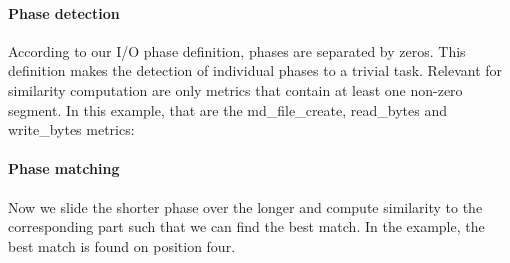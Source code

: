 \documentclass{jhps}
\begin{document}
\paragraph{Phase detection}
According to our I/O phase definition, phases are separated by zeros.
This definition makes the detection of individual phases to a trivial task.
Relevant for similarity computation are only metrics that contain at least one non-zero segment.
In this example, that are the md\_file\_create, read\_bytes and write\_bytes metrics:


\paragraph{Phase matching}
Now we slide the shorter phase over the longer and compute similarity to the corresponding part such that we can find the best match.
In the example, the best match is found on position four.
\end{document}
